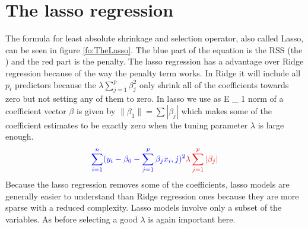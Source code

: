 \section{The lasso regression}
The formula for least absolute shrinkage and selection operator, also called Lasso, can be seen in figure \ref{fo:TheLasso}. The blue part of the equation is the RSS (the ) and the red part is the penalty. The lasso regression has a advantage over Ridge regression because of the way the penalty term works. In Ridge it will include all $p_i$ predictors because the $\lambda \sum_{j=1}^{p} \beta^2_j$ only shrink all of the coefficients towards zero but not setting any of them to zero. In lasso we use as E \_ 1 norm of a coefficient vector $\beta$ is given by $ \lVert \beta_1 \rVert = \sum | \beta_j |$ which makes some of the coefficient estimates to be exactly zero when the tuning parameter $\lambda$ is large enough.
\begin{align}\label{fo:TheLasso}
\color{blue} \sum_{i=1}^{n} ( y_i - \beta_0 - \sum_{j=1}^{p} \beta_j x_i,j )^2  \color{red} \lambda \sum_{j=1}^{p} |\beta_j|
\end{align}
Because the lasso regression removes some of the coefficients, lasso models are generally easier to understand than Ridge regression ones because they are  more sparse with a reduced complexity. Lasso models involve only a subset of the variables. As before selecting a good $\lambda$ is again important here.



